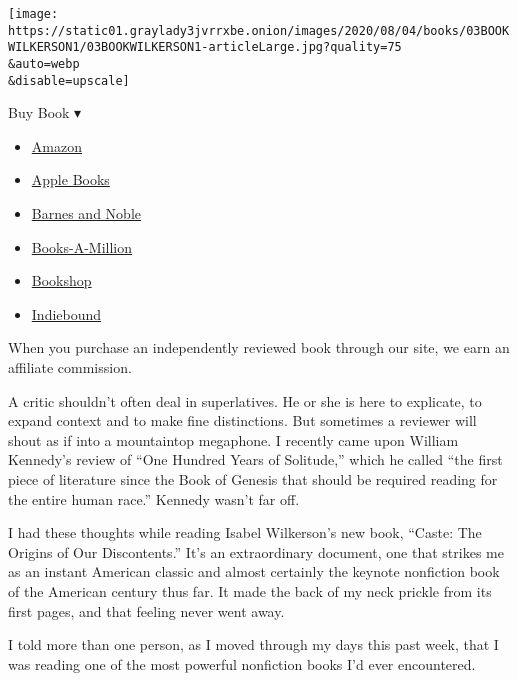 \texttt{[image: https://static01.graylady3jvrrxbe.onion/images/2020/08/04/books/03BOOKWILKERSON1/03BOOKWILKERSON1-articleLarge.jpg?quality=75\\\&auto=webp\\\&disable=upscale]}

Buy Book ▾

\begin{itemize}
\tightlist
\item
  \href{https://www.amazon.com/gp/search?index=books\&tag=NYTBSREV-20\&field-keywords=Caste+Isabel+Wilkerson}{Amazon}
\item
  \href{https://du-gae-books-dot-nyt-du-prd.appspot.com/buy?title=Caste\&author=Isabel+Wilkerson}{Apple
  Books}
\item
  \href{https://www.anrdoezrs.net/click-7990613-11819508?url=https\%3A\%2F\%2Fwww.barnesandnoble.com\%2Fw\%2F\%3Fean\%3D9780593230251}{Barnes
  and Noble}
\item
  \href{https://www.anrdoezrs.net/click-7990613-35140?url=https\%3A\%2F\%2Fwww.booksamillion.com\%2Fp\%2FCaste\%2FIsabel\%2BWilkerson\%2F9780593230251}{Books-A-Million}
\item
  \href{https://bookshop.org/a/3546/9780593230251}{Bookshop}
\item
  \href{https://www.indiebound.org/book/9780593230251?aff=NYT}{Indiebound}
\end{itemize}

When you purchase an independently reviewed book through our site, we
earn an affiliate commission.

A critic shouldn't often deal in superlatives. He or she is here to
explicate, to expand context and to make fine distinctions. But
sometimes a reviewer will shout as if into a mountaintop megaphone. I
recently came upon William Kennedy's review of ``One Hundred Years of
Solitude,'' which he called ``the first piece of literature since the
Book of Genesis that should be required reading for the entire human
race.'' Kennedy wasn't far off.

I had these thoughts while reading Isabel Wilkerson's new book, ``Caste:
The Origins of Our Discontents.'' It's an extraordinary document, one
that strikes me as an instant American classic and almost certainly the
keynote nonfiction book of the American century thus far. It made the
back of my neck prickle from its first pages, and that feeling never
went away.

I told more than one person, as I moved through my days this past week,
that I was reading one of the most powerful nonfiction books I'd ever
encountered.

